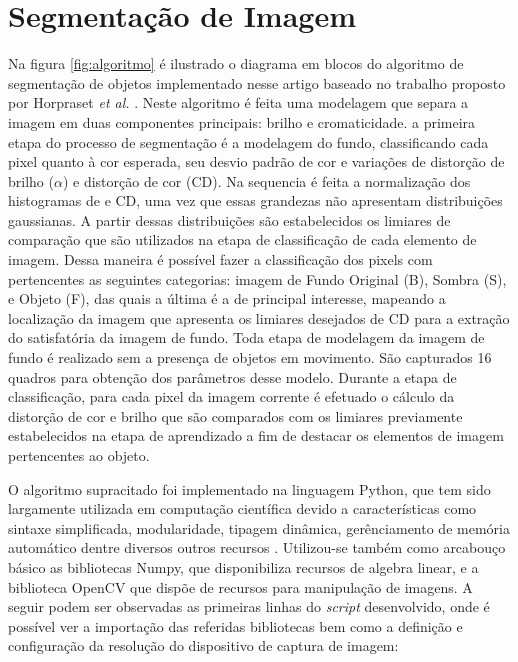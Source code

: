 \documentclass[conference]{IEEEtran}
\begin{document}
\newpage
\section{Segmentação de Imagem}

Na figura \ref{fig:algoritmo} é ilustrado o diagrama em blocos do algoritmo de segmentação de objetos implementado nesse artigo baseado no trabalho  proposto por Horpraset \textit{et al.} \cite{IEEEhowto:horprasert}. Neste algoritmo é feita uma modelagem que   separa a imagem em duas componentes principais: brilho e cromaticidade. a primeira etapa do processo de segmentação é a modelagem do fundo, classificando cada pixel quanto à cor esperada, seu desvio padrão de cor e variações de distorção de brilho (\(\alpha\)) e distorção de cor (CD). Na sequencia é feita a normalização dos histogramas de e CD, uma vez que essas grandezas não apresentam distribuições gaussianas. A partir dessas distribuições são estabelecidos os limiares de comparação que são utilizados na etapa de classificação de cada elemento de imagem. Dessa maneira  é possível fazer a classificação dos pixels com pertencentes as seguintes categorias: imagem de Fundo Original (B), Sombra (S), e Objeto  (F), das quais a última é a de principal interesse, mapeando a localização da imagem que apresenta os limiares desejados de CD para a extração do satisfatória da imagem de fundo. Toda etapa de modelagem da imagem de fundo é realizado sem a presença de objetos em movimento. São capturados 16 quadros para obtenção dos parâmetros desse modelo. Durante a etapa de classificação, para cada pixel da imagem corrente é efetuado o cálculo da distorção de cor e brilho que são comparados com os limiares previamente estabelecidos na etapa de aprendizado a fim de destacar os elementos de imagem pertencentes ao objeto.


O algoritmo supracitado foi implementado na linguagem Python, que tem sido largamente utilizada em computação científica devido a características como sintaxe simplificada, modularidade, tipagem dinâmica, gerênciamento de memória automático dentre diversos outros recursos \cite{IEEEhowto:fangohr}. Utilizou-se também como arcabouço básico as bibliotecas Numpy, que disponibiliza recursos de algebra linear, e a biblioteca OpenCV que dispõe de recursos para manipulação de imagens. A seguir podem ser observadas as primeiras linhas do \textit{script} desenvolvido, onde é possível ver a importação das referidas bibliotecas bem como a definição e configuração da resolução do dispositivo de captura de imagem:
\end{document}

